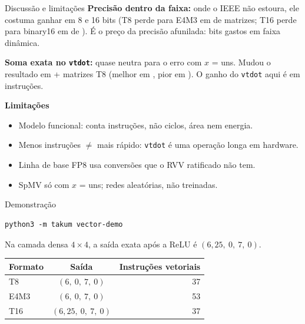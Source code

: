 \documentclass[aspectratio=169,10pt]{beamer}
\newcommand{\code}[1]{\texttt{#1}}
\begin{document}
\begin{frame}{Discussão e limitações}
\textbf{Precisão dentro da faixa:} onde o IEEE não estoura, ele costuma ganhar em
8 e 16 bits (T8 perde para E4M3 em \BenchWorseTEightEFourMThree{} de
\BenchInRangeTEightEFourMThree{} matrizes; T16 perde para binary16 em
\BenchWorseTSixteenFPSixteen{} de \BenchInRangeTSixteenFPSixteen). É o preço da
precisão afunilada: bits gastos em faixa dinâmica.
\vspace{0.6em}

\textbf{Soma exata no \code{vtdot}:} quase neutra para o erro com $x$ = uns. Mudou o
resultado em \the\numexpr\BenchBetterTEightTEightStep+\BenchWorseTEightTEightStep\relax{}
matrizes T8 (melhor em \BenchBetterTEightTEightStep, pior em \BenchWorseTEightTEightStep).
O ganho do \code{vtdot} aqui é em instruções.
\vspace{1em}

\textbf{Limitações}
\begin{itemize}
\item Modelo funcional: conta instruções, não ciclos, área nem energia.
\item Menos instruções $\neq$ mais rápido: \code{vtdot} é uma operação longa em hardware.
\item Linha de base FP8 usa conversões que o RVV ratificado não tem.
\item SpMV só com $x$ = uns; redes aleatórias, não treinadas.
\end{itemize}
\end{frame}

\begin{frame}[fragile]{Demonstração}
\begin{verbatim}
python3 -m takum vector-demo
\end{verbatim}

Na camada densa $4\times4$, a saída exata após a ReLU é
$(6{,}25,\ 0,\ 7,\ 0)$.

\medskip
\centering
\begin{tabular}{lcr}
\toprule
Formato & Saída & Instruções vetoriais \\
\midrule
T8   & $(6,\ 0,\ 7,\ 0)$ & 37 \\
E4M3 & $(6,\ 0,\ 7,\ 0)$ & 53 \\
T16  & $(6{,}25,\ 0,\ 7,\ 0)$ & 37 \\
\bottomrule
\end{tabular}
\end{frame}
\end{document}
